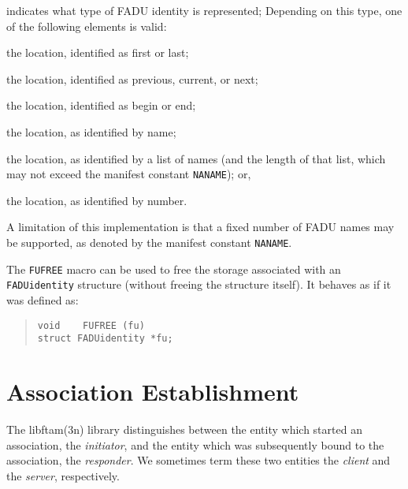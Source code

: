 \begin{describe}
\item[\verb"fa\_type":] indicates what type of FADU identity is represented;
Depending on this type, one of the following elements is valid:
\begin{describe}
\item[\verb"fa\_firstlast":] the location, identified as first or last;

\item[\verb"fa\_relative":] the location, identified as previous,
current, or next;

\item[\verb"fa\_beginend":] the location, identified as begin or end;

\item[\verb"fa\_singlename":] the location, as identified by name;

\item[\verb"fa\_names"/\verb"fa\_nname":] the location,
as identified by a list of names (and the length of that list,
which may not exceed the manifest constant \verb"NANAME");
or,

\item[\verb"fa\_fadunumber":] the location, as identified by number.
\end{describe}
\end{describe}
A limitation of this implementation
is that a fixed number of FADU names may be supported,
as denoted by the manifest constant \verb"NANAME".

The \verb"FUFREE" macro can be used to free the storage associated with an
\verb"FADUidentity" structure (without freeing the structure itself).
It behaves as if it was defined as:
\begin{quote}\small\begin{verbatim}
void    FUFREE (fu)
struct FADUidentity *fu;
\end{verbatim}\end{quote}

\section	{Association Establishment}
The \man libftam(3n) library distinguishes between the entity which started an
association,
the {\em initiator},
and the entity which was subsequently bound to the association,
the {\em responder}.
We sometimes term these two entities the {\em client\/} and the {\em server},
respectively.

